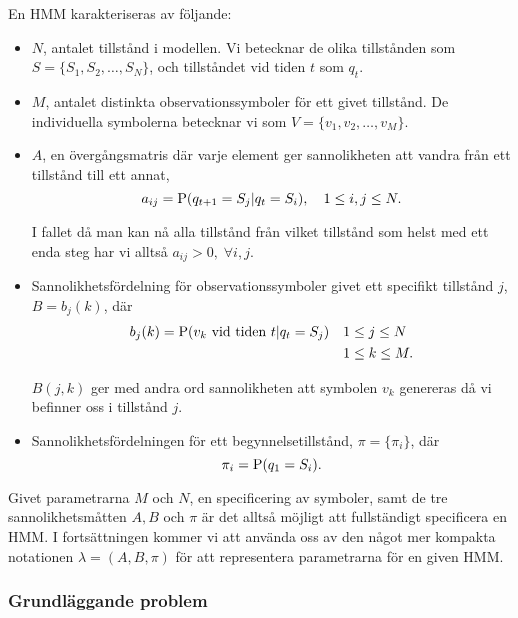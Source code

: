 \documentclass[../rapport_MVEX01-11-05]{subfiles}
\begin{document}
En HMM karakteriseras av följande:
\begin{itemize}
\item $N$, antalet tillstånd i modellen. Vi betecknar de olika
  tillstånden som $S = \{S_1, S_2, \dots, S_N\}$, och tillståndet vid
  tiden $t$ som $q_t$.
\item $M$, antalet distinkta observationssymboler för ett givet
  tillstånd. De individuella symbolerna betecknar vi som $V =
  \{v_1,v_2,\dots,v_M\}$.
\item $A$, en övergångsmatris där varje element ger sannolikheten att
  vandra från ett tillstånd till ett annat, 
\begin{equation*}
a_{ij} = \mathrm{P}(q_{t+1} = S_j|q_t = S_i),\quad 1 \leq i,j \leq N.
\end{equation*}

I fallet då man kan nå alla tillstånd från vilket tillstånd som helst
med ett enda steg har vi alltså $a_{ij} > 0,\;\forall i,j$. 
\item Sannolikhetsfördelning för observationssymboler givet ett
  specifikt tillstånd $j$, $B = b_j(k)$, där 
\begin{align*}
b_j(k) = \mathrm{P}(v_k \text{ vid tiden } t|q_t = S_j) \quad &1 \leq j \leq N\\
&1 \leq k \leq M.
\end{align*}

$B(j,k)$ ger med andra ord sannolikheten att symbolen $v_k$ genereras
då vi befinner oss i tillstånd $j$.
\item Sannolikhetsfördelningen för ett begynnelsetillstånd, $\pi =
  \{\pi_i\}$, där
\begin{equation*}
\pi_i = \mathrm{P}(q_1 = S_i).
\end{equation*}
\end{itemize}
Givet parametrarna $M$ och $N$, en specificering av symboler, samt de
tre sannolikhetsmåtten $A, B$ och $\pi$ är det alltså möjligt att
fullständigt specificera en HMM. I fortsättningen kommer vi att
använda oss av den något mer kompakta notationen $\lambda = (A,B,\pi)$
för att representera parametrarna för en given HMM.

\subsubsection{Grundläggande problem}
\end{document}
